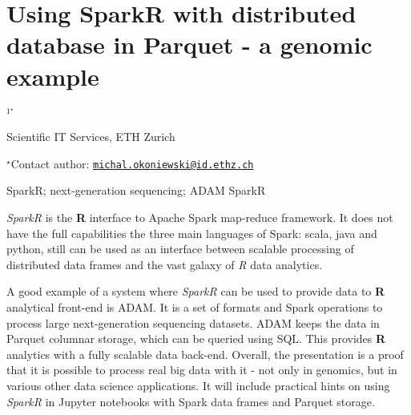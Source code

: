 \documentclass[\main/boa.tex]{subfiles}
\begin{document}
\pagestyle{empty}

\section{Using SparkR with distributed database in Parquet - a genomic example}

\begin{center}
  {\bf {}$^{1^\star}$}
\end{center}

\vskip 0.3cm

\begin{affiliations}
\begin{enumerate}
\begin{minipage}{0.915\textwidth}
\centering
\item Scientific IT Services, ETH Zurich \\[-2pt]
\end{minipage}
\end{enumerate}
$^\star$Contact author: \href{mailto:michal.okoniewski@id.ethz.ch}{\nolinkurl{michal.okoniewski@id.ethz.ch}}\\
\end{affiliations}

\vskip 0.5cm

\begin{minipage}{0.915\textwidth}
\keywords SparkR; next-generation sequencing; ADAM
\packages SparkR
\end{minipage}

\vskip 0.8cm

\emph{SparkR} is the \textbf{R} interface to Apache Spark map-reduce
framework. It does not have the full capabilities the three main
languages of Spark: scala, java and python, still can be used as an
interface between scalable processing of distributed data frames and the
vast galaxy of \emph{R} data analytics.

A good example of a system where \emph{SparkR} can be used to provide
data to \textbf{R} analytical front-end is ADAM. It is a set of formats
and Spark operations to process large next-generation sequencing
datasets. ADAM keeps the data in Parquet columnar storage, which can be
queried using SQL. This provides \textbf{R} analytics with a fully
scalable data back-end. Overall, the presentation is a proof that it is
possible to process real big data with it - not only in genomics, but in
various other data science applications. It will include practical hints
on using \emph{SparkR} in Jupyter notebooks with Spark data frames and
Parquet storage.
\end{document}
